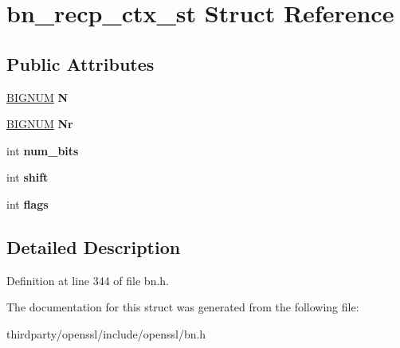 \hypertarget{structbn__recp__ctx__st}{}\section{bn\+\_\+recp\+\_\+ctx\+\_\+st Struct Reference}
\label{structbn__recp__ctx__st}
\subsection*{Public Attributes}
\begin{DoxyCompactItemize}
\item 
\mbox{\label{structbn__recp__ctx__st_ab52e6e895e525fba79d3a18ef2b3dcb8}} 
\hyperlink{structbignum__st}{B\+I\+G\+N\+UM} {\bfseries N}
\item 
\mbox{\label{structbn__recp__ctx__st_a2e7a01e3de39b7998cd21792a0b87565}} 
\hyperlink{structbignum__st}{B\+I\+G\+N\+UM} {\bfseries Nr}
\item 
\mbox{\label{structbn__recp__ctx__st_a685ffc37ed182cdebd42f2382f552cab}} 
int {\bfseries num\+\_\+bits}
\item 
\mbox{\label{structbn__recp__ctx__st_ac74357f903a13ec4404d8e0a2d752ec7}} 
int {\bfseries shift}
\item 
\mbox{\label{structbn__recp__ctx__st_acc82125c857d066e9f20f779d0a2ba3e}} 
int {\bfseries flags}
\end{DoxyCompactItemize}


\subsection{Detailed Description}


Definition at line 344 of file bn.\+h.



The documentation for this struct was generated from the following file\+:\begin{DoxyCompactItemize}
\item 
thirdparty/openssl/include/openssl/bn.\+h\end{DoxyCompactItemize}
